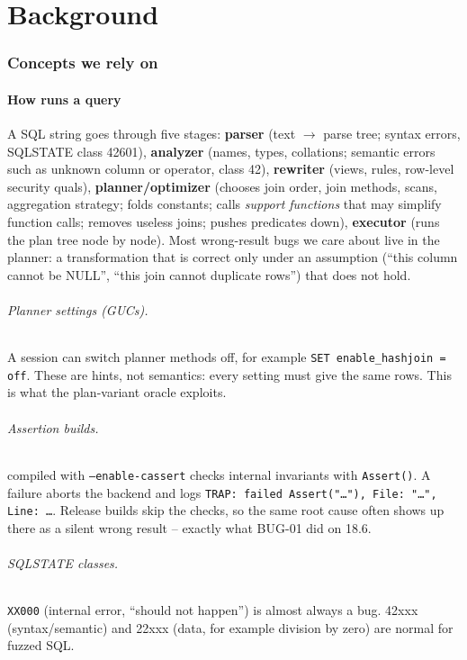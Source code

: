 \part{Background}

\section{Concepts we rely on}
\label{sec:background}

\subsection{How \pg runs a query}

A SQL string goes through five stages:
\textbf{parser} (text $\rightarrow$ parse tree; syntax errors, SQLSTATE class 42601),
\textbf{analyzer} (names, types, collations; semantic errors such as unknown
column or operator, class 42),
\textbf{rewriter} (views, rules, row-level security quals),
\textbf{planner/optimizer} (chooses join order, join methods, scans,
aggregation strategy; folds constants; calls \emph{support functions} that may
simplify function calls; removes useless joins; pushes predicates down),
\textbf{executor} (runs the plan tree node by node).
Most wrong-result bugs we care about live in the planner: a transformation
that is correct only under an assumption (``this column cannot be NULL'', ``this
join cannot duplicate rows'') that does not hold.

\paragraph{Planner settings (GUCs).} A session can switch planner methods off,
for example \texttt{SET enable\_hashjoin = off}. These are hints, not
semantics: every setting must give the same rows. This is what the
plan-variant oracle exploits.

\paragraph{Assertion builds.} \pg compiled with \texttt{--enable-cassert}
checks internal invariants with \texttt{Assert()}. A failure aborts the
backend and logs \texttt{TRAP: failed Assert("\dots"), File: "\dots", Line: \dots}.
Release builds skip the checks, so the same root cause often shows up there
as a silent wrong result -- exactly what BUG-01 did on 18.6.

\paragraph{SQLSTATE classes.} \texttt{XX000} (internal error, ``should not
happen'') is almost always a bug. 42xxx (syntax/semantic) and 22xxx (data,
for example division by zero) are normal for fuzzed SQL.

